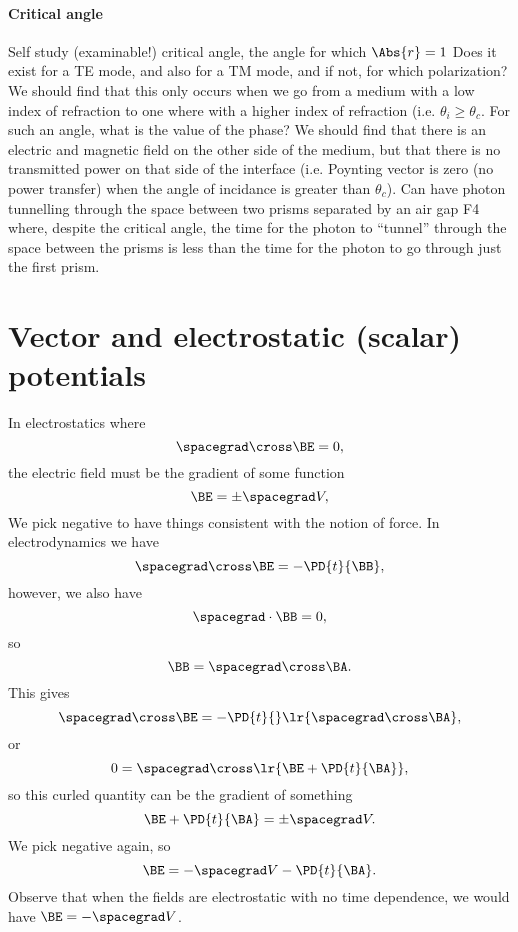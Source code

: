 \paragraph{Critical angle}
%
Self study (examinable!) critical angle, the angle for which \( \Abs{r} = 1 \)
%
Does it exist for a TE mode, and also for a TM mode, and if not, for which polarization?
%
We should find that this only occurs when we go from a medium with a low index of refraction to one where with a higher index of refraction (i.e. \( \theta_i \ge \theta_c \).
%
For such an angle, what is the value of the phase?
%
We should find that there is an electric and magnetic field on the other side of the medium, but that there is no transmitted power on that side of the interface (i.e. Poynting vector is zero (no power transfer) when the angle of incidance is greater than \( \theta_c \)).
%
Can have photon tunnelling through the space between two prisms separated by an air gap
%
F4
%
where, despite the critical angle, the time for the photon to ``tunnel'' through the space between the prisms is less than the time for the photon to go through just the first prism.
%
\section{Vector and electrostatic (scalar) potentials}
%
In electrostatics where
\begin{dmath}\label{eqn:emtLecture10:720}
\spacegrad \cross \BE  = 0,
\end{dmath}
%
the electric field must be the gradient of some function
\begin{dmath}\label{eqn:emtLecture10:740}
\BE = \pm \spacegrad V,
\end{dmath}
%
We pick negative to have things consistent with the notion of force.
%
In electrodynamics we have
\begin{dmath}\label{eqn:emtLecture10:760}
\spacegrad \cross \BE = - \PD{t}{\BB},
\end{dmath}
%
however, we also have
%
\begin{dmath}\label{eqn:emtLecture10:780}
\spacegrad \cdot \BB = 0,
\end{dmath}
%
so
\begin{dmath}\label{eqn:emtLecture10:800}
   \BB = \spacegrad \cross \BA.
\end{dmath}
%
This gives
\begin{dmath}\label{eqn:emtLecture10:820}
   \spacegrad \cross \BE = - \PD{t}{} \lr{ \spacegrad \cross \BA },
\end{dmath}
%
or
\begin{dmath}\label{eqn:emtLecture10:840}
0 =
\spacegrad \cross \lr{ \BE + \PD{t}{\BA} },
\end{dmath}
%
so this curled quantity can be the gradient of something
%
\begin{dmath}\label{eqn:emtLecture10:860}
\BE + \PD{t}{\BA} = \pm \spacegrad V.
\end{dmath}
%
We pick negative again, so
%
\begin{dmath}\label{eqn:emtLecture10:880}
\BE = -\spacegrad V -\PD{t}{\BA}.
\end{dmath}
%
Observe that when the fields are electrostatic with no time dependence, we would have \( \BE = -\spacegrad V \).
%
%
\EndNoBibArticle

